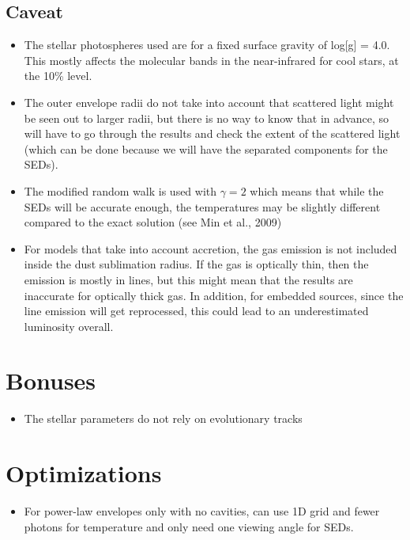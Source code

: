 \documentclass[10pt]{article}
\begin{document}
\subsection{Caveat}

\begin{itemize}

\item The stellar photospheres used are for a fixed surface gravity of log[g] = 4.0. This mostly affects the molecular bands in the near-infrared for cool stars, at the 10\% level.

\item The outer envelope radii do not take into account that scattered light might be seen out to larger radii, but there is no way to know that in advance, so will have to go through the results and check the extent of the scattered light (which can be done because we will have the separated components for the SEDs).

\item The modified random walk is used with $\gamma=2$ which means that while the SEDs will be accurate enough, the temperatures may be slightly different compared to the exact solution (see Min et al., 2009)

\item For models that take into account accretion, the gas emission is not included inside the dust sublimation radius. If the gas is optically thin, then the emission is mostly in lines, but this might mean that the results are inaccurate for optically thick gas. In addition, for embedded sources, since the line emission will get reprocessed, this could lead to an underestimated luminosity overall.

\end{itemize}

\section{Bonuses}

\begin{itemize}

\item The stellar parameters do not rely on evolutionary tracks

\end{itemize}

\section{Optimizations}

\begin{itemize}
\item For power-law envelopes only with no cavities, can use 1D grid and fewer photons for temperature and only need one viewing angle for SEDs.
\end{itemize}
\end{document}
